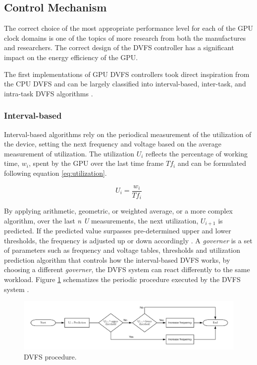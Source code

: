 \subsection{Control Mechanism}

The correct choice of the most appropriate performance level for each of the GPU clock domains is one of the topics of more research from both the manufactures and researchers. The correct design of the DVFS controller has a significant impact on the energy efficiency of the GPU.

The first implementations of GPU DVFS controllers took direct inspiration from the CPU DVFS and can be largely classified into interval-based, inter-task, and intra-task DVFS algorithms \cite{boyer_improving_2013}. 

\subsubsection{Interval-based}

Interval-based algorithms rely on the periodical measurement of the utilization of the device, setting the next frequency and voltage based on the average measurement of utilization. The utilization $U_{i}$ reflects the percentage of working time, $w_{i}$, spent by the GPU over the last time frame  $Tf_{i}$ and can be formulated following equation \ref{eq:utilization}.

\begin{equation}
    U_i=\frac{w_i}{Tf_i}
    \label{eq:utilization}
\end{equation}

By applying arithmetic, geometric, or weighted average, or a more complex algorithm, over the last \textit{n} \textit{U} measurements,  the next utilization, $U_{i+1}$ is predicted. If the predicted value surpasses pre-determined upper and lower thresholds, the frequency is adjusted up or down accordingly \cite{seongki_gpgpu-perf:_nodate}. 
A \textit{governer} is a set of parameters such as frequency and voltage tables, thresholds and utilization prediction algorithm that controls how the interval-based DVFS works, by choosing a different \textit{governer}, the DVFS system can react differently to the same workload. Figure \ref{fig:DVFSprocedure} schematizes the periodic procedure executed by the DVFS system \cite{seongki_gpgpu-perf:_nodate}. 

\begin{figure}[!htb]
  \centering
  \includegraphics[width=\textwidth]{Figures/StateArt/DVFSprogram.png}
  \caption[Controller]{DVFS procedure.}
  \label{fig:DVFSprocedure}
\end{figure}

